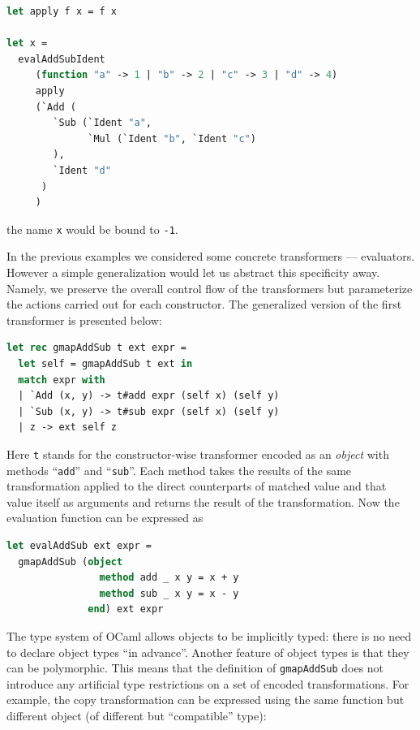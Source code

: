 \begin{lstlisting}[language=ocaml]
let apply f x = f x

let x = 
  evalAddSubIdent 
     (function "a" -> 1 | "b" -> 2 | "c" -> 3 | "d" -> 4)
     apply 
     (`Add (
        `Sub (`Ident "a", 
              `Mul (`Ident "b", `Ident "c")
        ), 
        `Ident "d"
      )
     )
\end{lstlisting}

the name \lstinline{x} would be bound to \lstinline{-1}.

In the previous examples we considered some concrete transformers --- evaluators.
However a simple generalization would let us abstract this specificity away. Namely, 
we preserve the overall control flow of the transformers but parameterize the
actions carried out for each constructor. The generalized version of the first 
transformer is presented below:

\begin{lstlisting}[language=ocaml]
let rec gmapAddSub t ext expr =
  let self = gmapAddSub t ext in
  match expr with
  | `Add (x, y) -> t#add expr (self x) (self y)
  | `Sub (x, y) -> t#sub expr (self x) (self y)
  | z -> ext self z
\end{lstlisting}

Here \lstinline{t} stands for the constructor-wise transformer encoded
as an \emph{object} with methods ``\lstinline{add}'' and ``\lstinline{sub}''.
Each method takes the results of the same transformation applied to the
direct counterparts of matched value and that value itself as arguments
and returns the result of the transformation. Now the evaluation function
can be expressed as

\begin{lstlisting}[language=ocaml]
let evalAddSub ext expr = 
  gmapAddSub (object
                method add _ x y = x + y
                method sub _ x y = x - y
              end) ext expr
\end{lstlisting}

The type system of OCaml allows objects to be implicitly typed: there is 
no need to declare object types ``in advance''. Another feature of object
types is that they can be polymorphic. This means that the definition of
\lstinline{gmapAddSub} does not introduce any artificial type restrictions
on a set of encoded transformations. For example, the copy transformation
can be expressed using the same function but different object (of different but
``compatible'' type):

